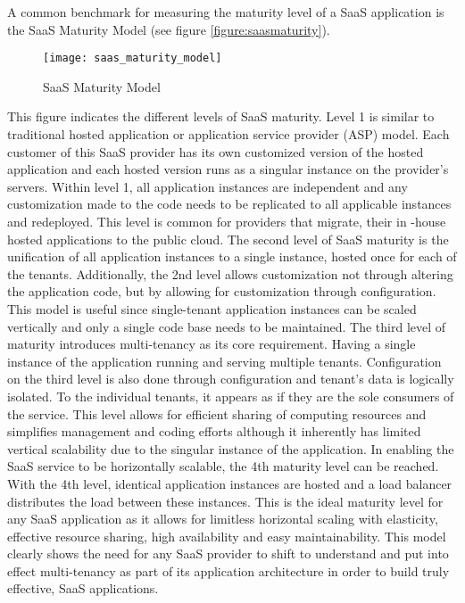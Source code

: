 A common benchmark for measuring the maturity level of a SaaS application is the SaaS Maturity Model (see figure \ref{figure:saasmaturity}).


\begin{figure}
\centering
\texttt{[image: saas\_maturity\_model]}
\caption{SaaS Maturity Model}
\label{saas_maturity_model}
\end{figure}


This figure indicates the different levels of SaaS maturity. Level 1 is similar to traditional hosted application or application service provider (ASP) model. Each customer of this SaaS provider has its own customized version of the hosted application and each hosted version runs as a singular instance on the provider's servers. Within level 1, all application instances are independent and any customization made to the code needs to be replicated to all applicable instances and redeployed. This level is common for providers that migrate, their in -house hosted applications to the public cloud. The second level of SaaS maturity is the unification of all application instances to a single instance, hosted once for each of the tenants. Additionally, the 2nd level allows customization not through altering the application code, but by allowing for customization through configuration. This model is useful since single-tenant application instances can be scaled vertically and only a single code base needs to be maintained. The third level of maturity introduces multi-tenancy as its core requirement. Having a single instance of the application running and serving multiple tenants. Configuration on the third level is also done through configuration and tenant's data is logically isolated. To the individual tenants, it appears as if they are the sole consumers of the service. This level allows for efficient sharing of computing resources and simplifies management and coding efforts although it inherently has limited vertical scalability due to the singular instance of the application. In enabling the SaaS service to be horizontally scalable, the 4th maturity level can be reached. With the 4th level, identical application instances are hosted and a load balancer distributes the load between these instances. This is the ideal maturity level for any SaaS application as it allows for limitless horizontal scaling with elasticity, effective resource sharing, high availability and easy maintainability. This model clearly shows the need for any SaaS provider to shift to understand and put into effect multi-tenancy as part of its application architecture in order to build truly effective,  SaaS applications.


